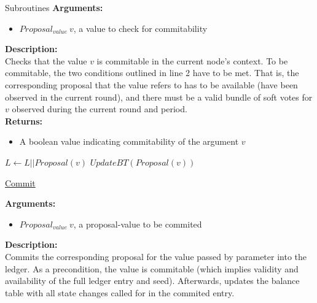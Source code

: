 \documentclass[10pt,a4paper]{article}
\begin{document}
\begin{section}{Subroutines}
\noindent \textbf{Arguments:}
\begin{itemize}
    \item $Proposal_{value} \ v$, a value to check for commitability
  \end{itemize}

\noindent \textbf{Description:}\\
Checks that the value $v$ is commitable in the current node's context.
To be commitable, the two conditions outlined in line 2 have to be met.
That is, the corresponding proposal that the value refers to has to be
available (have been observed in the current round), and there must
be a valid bundle of soft votes for $v$ observed during the current round and
period. \\

\noindent \textbf{Returns:}
\begin{itemize}
    \item A boolean value indicating commitability of the argument $v$
  \end{itemize}


\begin{algorithm}[H]
    \begin{algorithmic}[1]

    \State $L \gets L || Proposal(v)$
    \State $UpdateBT(Proposal(v))$

    \EndFunction
    \end{algorithmic}
    \caption{\underline{Commit}}
\end{algorithm}


\noindent \textbf{Arguments:}
\begin{itemize}
    \item $Proposal_{value} \ v$, a proposal-value to be commited
  \end{itemize}

\noindent \textbf{Description:}\\
Commits the corresponding proposal for the value passed by parameter into the ledger.
As a precondition, the value is commitable (which implies validity and availability of the full
ledger entry and seed).
Afterwards, updates the balance table with all state changes called for in the commited entry.



\end{section}
\end{document}
